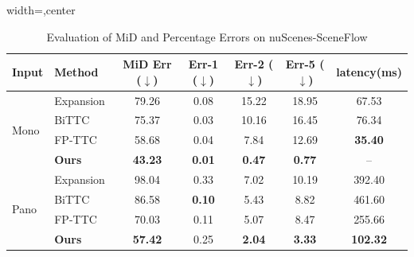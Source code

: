 \documentclass[journal]{IEEEtran}
\begin{document}
\begin{table}[t]
\centering
\caption{Evaluation of MiD and Percentage Errors on nuScenes-SceneFlow}
\label{table:mid_err}
\setlength{\tabcolsep}{4pt} 
\footnotesize               
\begin{adjustbox}{width=\columnwidth,center}
\begin{tabular}{@{}l l c c c c c@{}}
\toprule
\textbf{Input} & \textbf{Method} & \textbf{MiD Err} (\(\downarrow\)) & \textbf{Err-1} (\(\downarrow\)) & \textbf{Err-2} (\(\downarrow\)) & \textbf{Err-5} (\(\downarrow\)) & \textbf{latency(ms)} \\
\midrule
\multirow{4}{*}{Mono}
    & Expansion~\cite{yang2020opticalexpansion} & 79.26           & 0.08          & 15.22         & 18.95         & 67.53 \\
    & BiTTC~\cite{badki2021binaryttc}           & 75.37           & 0.03          & 10.16         & 16.45         & 76.34 \\
    & FP-TTC~\cite{li2024fpttc}                  & 58.68           & 0.04          & 7.84          & 12.69        & \textbf{35.40} \\
    & \textbf{Ours}                             & \textbf{43.23}  & \textbf{0.01} & \textbf{0.47} & \textbf{0.77} & -- \\
\midrule
\multirow{4}{*}{Pano}
    & Expansion~\cite{yang2020opticalexpansion} & 98.04          & 0.33          & 7.02          & 10.19         & 392.40 \\
    & BiTTC~\cite{badki2021binaryttc}           & 86.58          & \textbf{0.10} & 5.43          & 8.82          & 461.60 \\
    & FP-TTC~\cite{li2024fpttc}                  & 70.03          & 0.11          & 5.07          & 8.47          & 255.66 \\
    & \textbf{Ours}                             & \textbf{57.42} & 0.25          & \textbf{2.04} & \textbf{3.33} & \textbf{102.32} \\
\bottomrule
\end{tabular}
\end{adjustbox}
\end{table}
\end{document}
